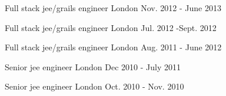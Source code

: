 \begin{cventries}
  \cventry
    {Full stack jee/grails engineer} %
    {} %
    {London} %
    {Nov. 2012 - June 2013} %
    {}
    {}

  \cventry
    {Full stack jee/grails engineer} %
    {} %
    {London} %
    {Jul. 2012 -Sept. 2012} %
    {}
    {}

  \cventry
    {Full stack jee/grails engineer} %
    {} %
    {London} %
    {Aug. 2011 - June 2012} %
    {}
    {}

  \cventry
    {Senior jee engineer} %
    {} %
    {London} %
    {Dec 2010 - July 2011} %
    {}
    {}

  \cventry
    {Senior jee engineer} %
    {} %
    {London} %
    {Oct. 2010 - Nov. 2010} %
    {}
    {}
\end{cventries}




